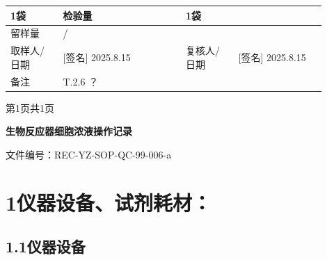 \documentclass[UTF8,10pt,a4paper,fontset=fandol]{ctexart}
\newcommand{\fieldvalue}[1]{#1}
\newcommand{\handwritten}[1]{#1}
\begin{document}
\begin{tabular}{|p{0.15\linewidth}|p{0.35\linewidth}|p{0.15\linewidth}|p{0.25\linewidth}|}
\fieldvalue{1袋} &
检验量 &
\fieldvalue{1袋}
\\ \hline
\multicolumn{1}{|p{0.15\linewidth}|}{留样量} &
\multicolumn{1}{p{0.18\linewidth}|}{
\fieldvalue{/}} &
\multicolumn{2}{p{0.42\linewidth}|}{} \\
\hline
取样人/日期 &
\multicolumn{1}{p{0.35\linewidth}|}{
\fieldvalue{\handwritten{[签名]}}\newline
\fieldvalue{\handwritten{2025.8.15}}} &
复核人/日期 &
\multicolumn{1}{p{0.25\linewidth}|}{
\fieldvalue{\handwritten{[签名]}}\newline
\fieldvalue{\handwritten{2025.8.15}}}
\\ \hline
备注 &
\multicolumn{3}{p{0.75\linewidth}|}{
\fieldvalue{\handwritten{T.2.6 ？}}}
\\ \hline
\end{tabular}

\begin{center}
第1页共1页
\end{center}

\newpage

\begin{center}
\textbf{生物反应器细胞浓液操作记录}
\end{center}

文件编号：REC-YZ-SOP-QC-99-006-a

\section*{1\quad 仪器设备、试剂耗材：}

\subsection*{1.1\quad 仪器设备}
\end{document}
